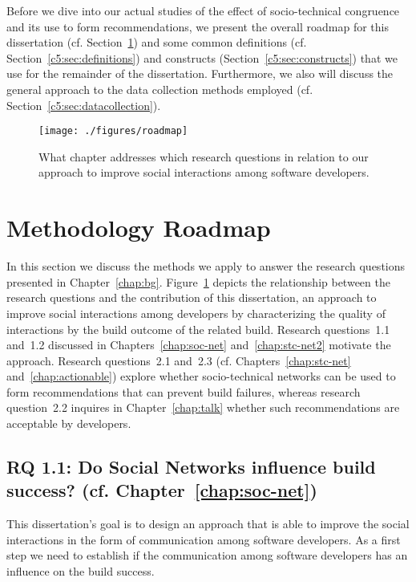 \label{chap:meth}
Before we dive into our actual studies of the effect of socio-technical congruence and its use to form recommendations, we present the overall roadmap for this dissertation (cf. Section~\ref{c5:sec:roadmap}) and some common definitions (cf. Section~\ref{c5:sec:definitions}) and constructs (Section~\ref{c5:sec:constructs}) that we use for the remainder of the dissertation.
Furthermore, we also will discuss the general approach to the data collection methods employed (cf. Section~\ref{c5:sec:datacollection}).

\begin{figure}[h!]
\centering
\texttt{[image: ./figures/roadmap]}
\caption{What chapter addresses which research questions in relation to our approach to improve social interactions among software developers.}
\label{fig:roadmap}
\end{figure}

\section{Methodology Roadmap}
\label{c5:sec:roadmap}
In this section we discuss the methods we apply to answer the research questions presented in Chapter~\ref{chap:bg}.
Figure~\ref{fig:roadmap} depicts the relationship between the research questions and the contribution of this dissertation, an approach to improve social interactions among developers by characterizing the quality of interactions by the build outcome of the related build.
Research questions~1.1 and~1.2 discussed in Chapters~\ref{chap:soc-net} and~\ref{chap:stc-net2} motivate the approach.
Research questions~2.1 and~2.3 (cf. Chapters~\ref{chap:stc-net} and~\ref{chap:actionable}) explore whether socio-technical networks can be used to form recommendations that can prevent build failures, whereas research question~2.2 inquires in Chapter~\ref{chap:talk} whether such recommendations are acceptable by developers.

\subsection{%
  RQ 1.1: Do Social Networks influence build success? (cf. Chapter~\ref{chap:soc-net})}
This dissertation's goal is to design an approach that is able to improve the social interactions in the form of communication among software developers.
As a first step we need to establish if the communication among software developers has an influence on the build success.

